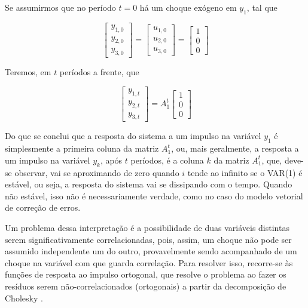 \documentclass[a4paper,
               article,
               12pt,
               openany,
               oneside,
               english,
               brazil]{abntex2}
\numberwithin{equation}{section}
\begin{document}
    Se assumirmos que no período $ t = 0 $ há um choque exógeno em $ y_1 $, tal que

    \begin{equation*}
        \begin{bmatrix}
            y_{1,0} \\
            y_{2,0} \\
            y_{3,0}
        \end{bmatrix} =
        \begin{bmatrix}
            u_{1,0} \\
            u_{2,0} \\
            u_{3,0}
        \end{bmatrix} =
        \begin{bmatrix}
            1 \\
            0 \\
            0
        \end{bmatrix}
    \end{equation*}

    Teremos, em $ t $ períodos a frente, que

    \begin{equation*}
        \begin{bmatrix}
            y_{1,t} \\
            y_{2,t} \\
            y_{3,t}
        \end{bmatrix} =
        A_1^{t}
        \begin{bmatrix}
            1 \\
            0 \\
            0
        \end{bmatrix}
    \end{equation*}

    Do que se conclui que a resposta do sistema a um impulso na variável $ y_1 $ é simplesmente a primeira coluna da matriz $ A_1^{t} $, ou, mais geralmente, a resposta a um impulso na variável $ y_k $, após $ t $ períodos, é a coluna $ k $ da matriz $ A_1^{t} $, que, deve-se observar, vai se aproximando de zero quando $ i $ tende ao infinito se o VAR(1) é estável, ou seja, a resposta do sistema vai se dissipando com o tempo. Quando não estável, isso não é necessariamente verdade, como no caso do modelo vetorial de correção de erros.

   Um problema dessa interpretação é a possibilidade de duas variáveis distintas serem significativamente correlacionadas, pois, assim, um choque não pode ser assumido independente um do outro, provavelmente sendo acompanhado de um choque na variável com que guarda correlação. Para resolver isso, recorre-se às funções de resposta ao impulso ortogonal, que resolve o problema ao fazer os resíduos serem não-correlacionados (ortogonais) a partir da decomposição de Cholesky \cite[56-62]{lutkepool}.
\end{document}

